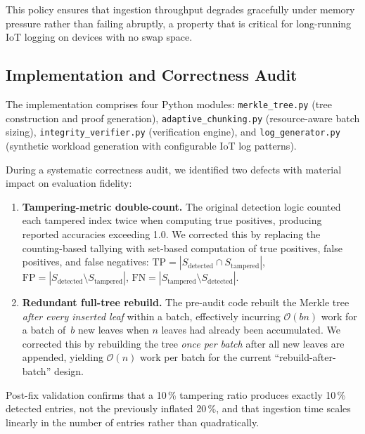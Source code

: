 \documentclass[preprint,12pt]{elsarticle}
\begin{document}
This policy ensures that ingestion throughput degrades gracefully under memory pressure rather than failing abruptly, a property that is critical for long-running IoT logging on devices with no swap space.

\subsection{Implementation and Correctness Audit}
\label{sec:audit}

The implementation comprises four Python modules: \texttt{merkle\_tree.py} (tree construction and proof generation), \texttt{adaptive\_chunking.py} (resource-aware batch sizing), \texttt{integrity\_verifier.py} (verification engine), and \texttt{log\_generator.py} (synthetic workload generation with configurable IoT log patterns).

During a systematic correctness audit, we identified two defects with material impact on evaluation fidelity:

\begin{enumerate}[leftmargin=*, label=\textbf{D\arabic*.}]
  \item \textbf{Tampering-metric double-count.}
    The original detection logic counted each tampered index twice when computing true positives, producing reported accuracies exceeding 1.0.
    We corrected this by replacing the counting-based tallying with set-based computation of true positives, false positives, and false negatives: $\mathrm{TP} = |S_{\text{detected}} \cap S_{\text{tampered}}|$, $\mathrm{FP} = |S_{\text{detected}} \setminus S_{\text{tampered}}|$, $\mathrm{FN} = |S_{\text{tampered}} \setminus S_{\text{detected}}|$.

  \item \textbf{Redundant full-tree rebuild.}
    The pre-audit code rebuilt the Merkle tree \emph{after every inserted leaf} within a batch, effectively incurring $\mathcal{O}(b n)$ work for a batch of~$b$ new leaves when $n$ leaves had already been accumulated.
    We corrected this by rebuilding the tree \emph{once per batch} after all new leaves are appended, yielding $\mathcal{O}(n)$ work per batch for the current ``rebuild-after-batch'' design.
\end{enumerate}

Post-fix validation confirms that a 10\,\% tampering ratio produces exactly 10\,\% detected entries, not the previously inflated 20\,\%, and that ingestion time scales linearly in the number of entries rather than quadratically.
\end{document}
